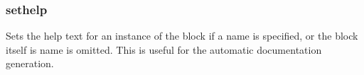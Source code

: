 \documentclass[10pt,a4paper]{article}
\begin{document}
\subsubsection{sethelp}

Sets the help text for an instance of the block if a name is specified, or the block itself is name is omitted. This is useful for the automatic documentation generation. \\

\end{document}
